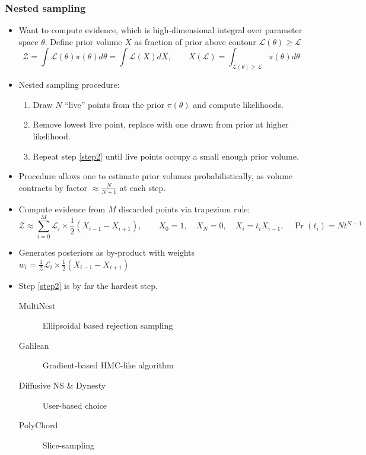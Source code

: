 \documentclass[%
    9pt,
]{beamer}
\begin{document}
\begin{frame}
    \frametitle{Nested sampling}
    \begin{itemize}
        \item Want to compute evidence, which is high-dimensional integral over parameter space $\theta$. Define prior volume $X$ as fraction of prior above contour $\mathcal{L}(\theta)\ge \mathcal{L}$
            \[\mathcal{Z} = \int \mathcal{L}(\theta) \pi(\theta) d\theta = \int \mathcal{L}(X) dX, \qquad X(\mathcal{L}) = \int_{\mathcal{L}(\theta)\ge\mathcal{L}} \pi(\theta) d\theta \]
        \item Nested sampling procedure:
            \begin{enumerate}
                \item Draw $N$ ``live'' points from the prior $\pi(\theta)$ and compute likelihoods.
                \item Remove lowest live point, replace with one drawn from prior at higher likelihood.\label{step2}
                \item Repeat step \ref{step2} until live points occupy a small enough prior volume.
            \end{enumerate}
        \item Procedure allows one to estimate prior volumes probabilistically, as volume contracts by factor $\approx\frac{N}{N+1}$ at each step.
        \item Compute evidence from $M$ discarded points via trapezium rule:
            \[ \mathcal{Z} \approx \sum_{i=0}^{M} \mathcal{L}_i \times \frac{1}{2}(X_{i-1}-X_{i+1}), \qquad X_0=1, \quad X_N =0, \quad X_i= t_i X_{i-1}, \quad \Pr(t_i) = N t^{N-1}  \]
        \item Generates posteriors as by-product with weights $w_i = \frac{1}{\mathcal{Z}}\mathcal{L}_i \times \frac{1}{2}(X_{i-1}-X_{i+1})$
        \item Step \ref{step2} is by far the hardest step.
            \begin{description}
                \item[MultiNest] Ellipsoidal based rejection sampling
                \item[Galilean] Gradient-based HMC-like algorithm
                \item[Diffusive NS \& Dynesty] User-based choice
                \item[PolyChord] Slice-sampling 
            \end{description}

    \end{itemize}

\end{frame}
\end{document}
